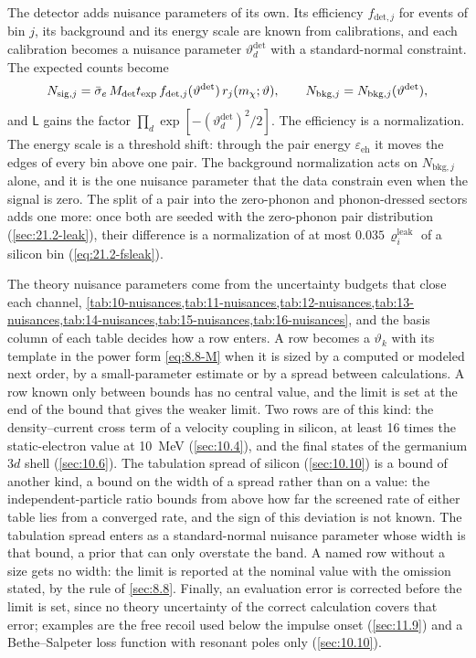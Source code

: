 The detector adds nuisance parameters of its own. Its efficiency $f_{\mathrm{det},j}$ for events of bin $j$, its background and its energy scale are known from calibrations, and each calibration becomes a nuisance parameter $\vartheta^{\mathrm{det}}_d$ with a standard-normal constraint. The expected counts become
\begin{equation}
  N_{\mathrm{sig},j} = \bar{\sigma}_{e}\,M_{\mathrm{det}}t_{\mathrm{exp}}\,f_{\mathrm{det},j}(\vartheta^{\mathrm{det}})\,r_j(m_{\chi};\vartheta) , \qquad N_{\mathrm{bkg},j} = N_{\mathrm{bkg},j}(\vartheta^{\mathrm{det}}) ,
  \label{eq:21.4-Nsig}
\end{equation}
and $\mathsf{L}$ gains the factor $\prod_d\exp[-(\vartheta^{\mathrm{det}}_d)^2/2]$. The efficiency is a normalization. The energy scale is a threshold shift: through the pair energy $\varepsilon_{\mathrm{eh}}$ it moves the edges of every bin above one pair. The background normalization acts on $N_{\mathrm{bkg},j}$ alone, and it is the one nuisance parameter that the data constrain even when the signal is zero. The split of a pair into the zero-phonon and phonon-dressed sectors adds one more: once both are seeded with the zero-phonon pair distribution (\cref{sec:21.2-leak}), their difference is a normalization of at most $0.035\,\varrho^{\mathrm{leak}}_i$ of a silicon bin (\cref{eq:21.2-fsleak}).

The theory nuisance parameters come from the uncertainty budgets that close each channel, \cref{tab:10-nuisances,tab:11-nuisances,tab:12-nuisances,tab:13-nuisances,tab:14-nuisances,tab:15-nuisances,tab:16-nuisances}, and the basis column of each table decides how a row enters. A row becomes a $\vartheta_k$ with its template in the power form \cref{eq:8.8-M} when it is sized by a computed or modeled next order, by a small-parameter estimate or by a spread between calculations. A row known only between bounds has no central value, and the limit is set at the end of the bound that gives the weaker limit. Two rows are of this kind: the density--current cross term of a velocity coupling in silicon, at least 16 times the static-electron value at \SI{10}{MeV} (\cref{sec:10.4}), and the final states of the germanium $3d$ shell (\cref{sec:10.6}). The tabulation spread of silicon (\cref{sec:10.10}) is a bound of another kind, a bound on the width of a spread rather than on a value: the independent-particle ratio bounds from above how far the screened rate of either table lies from a converged rate, and the sign of this deviation is not known. The tabulation spread enters as a standard-normal nuisance parameter whose width is that bound, a prior that can only overstate the band. A named row without a size gets no width: the limit is reported at the nominal value with the omission stated, by the rule of \cref{sec:8.8}. Finally, an evaluation error is corrected before the limit is set, since no theory uncertainty of the correct calculation covers that error; examples are the free recoil used below the impulse onset (\cref{sec:11.9}) and a Bethe--Salpeter loss function with resonant poles only (\cref{sec:10.10}).


